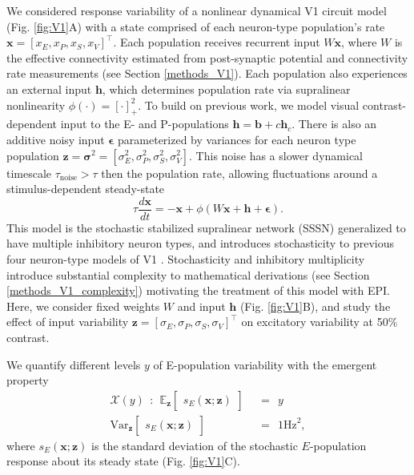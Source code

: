 \documentclass[11pt]{article}
\begin{document}
We considered response variability of a nonlinear dynamical V1 circuit model (Fig. \ref{fig:V1}A) with a state comprised of each neuron-type population's rate $\mathbf{x} = \left[x_E, x_P , x_S, x_V \right]^\top$.
Each population receives recurrent input $W \mathbf{x}$, where $W$ is the effective connectivity estimated from post-synaptic potential and connectivity rate measurements (see Section \ref{methods_V1}).
Each population also experiences an external input $\mathbf{h}$, which determines population rate via supralinear nonlinearity $\phi(\cdot) = \left[\cdot \right]^2_+$.
To build on previous work, we model visual contrast-dependent input to the E- and P-populations $\mathbf{h} = \mathbf{b} + c\mathbf{h}_c$.
There is also an additive noisy input $\bm{\epsilon}$ parameterized by variances for each neuron type population $\mathbf{z} = \bm{\sigma}^2 = \left[ \sigma_E^2, \sigma_P^2, \sigma_S^2, \sigma_V^2\right]$.
This noise has a slower dynamical timescale $\tau_{\text{noise}} > \tau$ then the population rate, allowing fluctuations around a stimulus-dependent steady-state
\begin{equation}
    \tau \frac{d\mathbf{x}}{dt} = -\mathbf{x} +\phi(W\mathbf{x} + \mathbf{h} + \bm{\epsilon}).
\end{equation}
This model is the stochastic stabilized supralinear network (SSSN) \cite{hennequin2018dynamical} generalized to have multiple inhibitory neuron types, and introduces stochasticity to previous four neuron-type models of V1 \cite{litwin2016inhibitory}.
Stochasticity and inhibitory multiplicity introduce substantial complexity to mathematical derivations (see Section \ref{methods_V1_complexity}) motivating the treatment of this model with EPI.
Here, we consider fixed weights $W$ and input $\mathbf{h}$ \cite{palmigiano2020structure} (Fig. \ref{fig:V1}B), and study the effect of input variability $\mathbf{z} = [\sigma_E, \sigma_P, \sigma_S, \sigma_V]^\top$ on excitatory variability at 50\% contrast. 

We quantify different levels $y$ of E-population variability with the emergent property
\begin{equation}\label{eq:EP_V1}
\begin{split}
\mathcal{X}(y) ~~:~~  \mathbb{E}_{\mathbf{z}}\begin{bmatrix} s_E(\mathbf{x}; \mathbf{z}) \end{bmatrix}  &~~=~~ y \\ 
 \text{Var}_{\mathbf{z}}\begin{bmatrix} s_E(\mathbf{x}; \mathbf{z}) \end{bmatrix}  &~~=~~  1 \text{Hz}^2,
\end{split}
\end{equation}
where $s_E(\mathbf{x}; \mathbf{z})$ is the standard deviation of the stochastic $E$-population response about its steady state (Fig. \ref{fig:V1}C).
\end{document}
